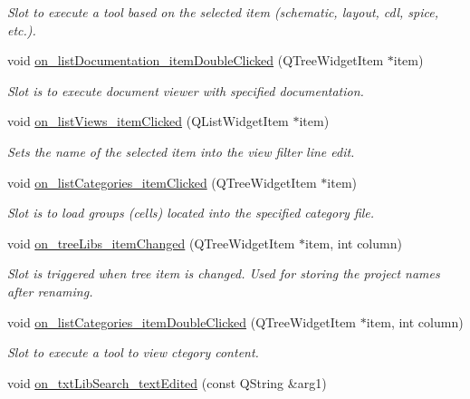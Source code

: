 \begin{DoxyCompactItemize}
\begin{DoxyCompactList}\small\item\em Slot to execute a tool based on the selected item (schematic, layout, cdl, spice, etc.). \end{DoxyCompactList}\item 
void \hyperlink{classMainWindow_aca2a1d9becfed505821bb7e7a945d5b5}{on\-\_\-list\-Documentation\-\_\-item\-Double\-Clicked} (Q\-Tree\-Widget\-Item $\ast$item)
\begin{DoxyCompactList}\small\item\em Slot is to execute document viewer with specified documentation. \end{DoxyCompactList}\item 
void \hyperlink{classMainWindow_a466c34043cd652304aa4e7e0e31ccf0f}{on\-\_\-list\-Views\-\_\-item\-Clicked} (Q\-List\-Widget\-Item $\ast$item)
\begin{DoxyCompactList}\small\item\em Sets the name of the selected item into the view filter line edit. \end{DoxyCompactList}\item 
void \hyperlink{classMainWindow_ab6bac75e491c0ff6399d8761a4d9b291}{on\-\_\-list\-Categories\-\_\-item\-Clicked} (Q\-Tree\-Widget\-Item $\ast$item)
\begin{DoxyCompactList}\small\item\em Slot is to load groups (cells) located into the specified category file. \end{DoxyCompactList}\item 
void \hyperlink{classMainWindow_a53c77b4bec2f9f9e5ee2a9f3c1100caf}{on\-\_\-tree\-Libs\-\_\-item\-Changed} (Q\-Tree\-Widget\-Item $\ast$item, int column)
\begin{DoxyCompactList}\small\item\em Slot is triggered when tree item is changed. Used for storing the project names after renaming. \end{DoxyCompactList}\item 
void \hyperlink{classMainWindow_aa829e818519a2d617c78b3e832e3a4ea}{on\-\_\-list\-Categories\-\_\-item\-Double\-Clicked} (Q\-Tree\-Widget\-Item $\ast$item, int column)
\begin{DoxyCompactList}\small\item\em Slot to execute a tool to view ctegory content. \end{DoxyCompactList}\item 
void \hyperlink{classMainWindow_a3d411ebea0a66c65174a7918a5317881}{on\-\_\-txt\-Lib\-Search\-\_\-text\-Edited} (const Q\-String \&arg1)

\end{DoxyCompactItemize}
